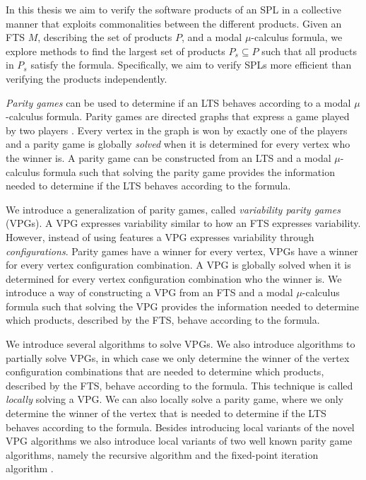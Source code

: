 In this thesis we aim to verify the software products of an SPL in a collective manner that exploits commonalities between the different products. Given an FTS $M$, describing the set of products $P$, and a modal $\mu$-calculus formula, we explore methods to find the largest set of products $P_s \subseteq P$ such that all products in $P_s$ satisfy the formula. Specifically, we aim to verify SPLs more efficient than verifying the products independently.

\textit{Parity games} can be used to determine if an LTS behaves according to a modal $\mu$-calculus formula. Parity games are directed graphs that express a game played by two players \cite{Bradfield2018}. Every vertex in the graph is won by exactly one of the players and a parity game is globally \textit{solved} when it is determined for every vertex who the winner is. A parity game can be constructed from an LTS and a modal $\mu$-calculus formula such that solving the parity game provides the information needed to determine if the LTS behaves according to the formula.

We introduce a generalization of parity games, called \textit{variability parity games} (VPGs). A VPG expresses variability similar to how an FTS expresses variability. However, instead of using features a VPG expresses variability through \textit{configurations}. Parity games have a winner for every vertex, VPGs have a winner for every vertex configuration combination. A VPG is globally solved when it is determined for every vertex configuration combination who the winner is. We introduce a way of constructing a VPG from an FTS and a modal $\mu$-calculus formula such that solving the VPG provides the information needed to determine which products, described by the FTS, behave according to the formula.

We introduce several algorithms to solve VPGs. We also introduce algorithms to partially solve VPGs, in which case we only determine the winner of the vertex configuration combinations that are needed to determine which products, described by the FTS, behave according to the formula. This technique is called \textit{locally} solving a VPG. We can also locally solve a parity game, where we only determine the winner of the vertex that is needed to determine if the LTS behaves according to the formula. Besides introducing local variants of the novel VPG algorithms we also introduce local variants of two well known parity game algorithms, namely the recursive algorithm \cite{ZIELONKA1998135,MCNAUGHTON1993149} and the fixed-point iteration algorithm \cite{WALUKIEWICZ2002311,FPITE}.

